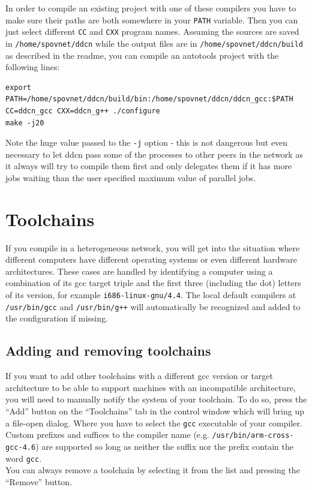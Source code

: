 \documentclass[a4paper,9pt]{scrartcl}
\begin{document}
In order to compile an existing project with one of these compilers you have to make sure their paths are both somewhere in your \texttt{PATH} variable. Then you can just select different \texttt{CC} and \texttt{CXX} program names. Assuming the sources are saved in \texttt{/home/spovnet/ddcn} while the output files are in \texttt{/home/spovnet/ddcn/build} as described in the readme, you can compile an autotools project with the following lines:

\begin{verbatim}
export PATH=/home/spovnet/ddcn/build/bin:/home/spovnet/ddcn/ddcn_gcc:$PATH
CC=ddcn_gcc CXX=ddcn_g++ ./configure
make -j20
\end{verbatim} 

Note the huge value passed to the \texttt{-j} option - this is not dangerous but even necessary to let ddcn pass some of the processes to other peers in the network as it always will try to compile them first and only delegates them if it has more jobs waiting than the user specified maximum value of parallel jobs.

\section{Toolchains}

If you compile in a heterogeneous network, you will get into the situation where different computers have different operating systems or even different hardware architectures. These cases are handled by identifying a computer using a combination of its gcc target triple and the first three (including the dot) letters of its version, for example \texttt{i686-linux-gnu/4.4}. The local default compilers at \texttt{/usr/bin/gcc} and \texttt{/usr/bin/g++} will automatically be recognized and added to the configuration if missing.

\subsection{Adding and removing toolchains}

If you want to add other toolchains with a different gcc version or target architecture to be able to support machines with an incompatible architecture, you will need to manually notify the system of your toolchain. To do so, press the ``Add'' button on the ``Toolchains'' tab in the control window which will bring up a file-open dialog. Where you have to select the \texttt{gcc} executable of your compiler. Custom prefixes and suffices to the compiler name (e.g. \texttt{/usr/bin/arm-cross-gcc-4.6}) are supported so long as neither the suffix nor the prefix contain the word \texttt{gcc}. \\You can always remove a toolchain by selecting it from the list and pressing the ``Remove'' button.
\end{document}
